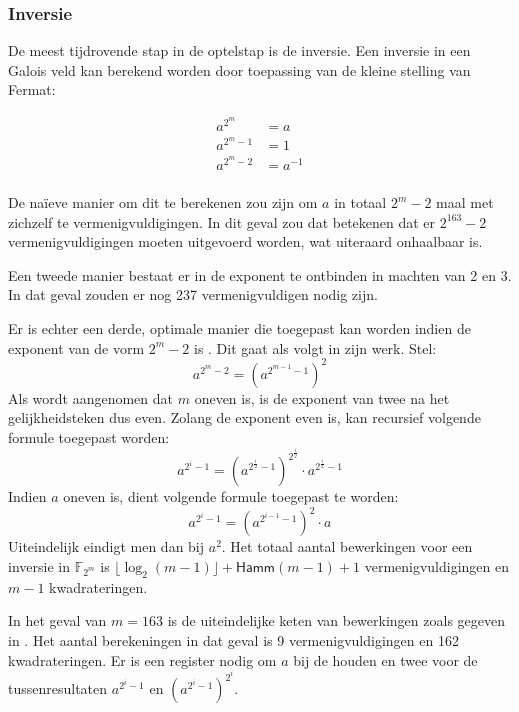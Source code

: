 \subsubsection{Inversie}

De meest tijdrovende stap in de optelstap is de inversie.  Een inversie in een Galois veld kan berekend worden door toepassing van de kleine stelling van Fermat:

\[\begin{aligned}
a^{2^m}		&= a\\
a^{2^m - 1}	&= 1\\
a^{2^m - 2}	&= a^{-1}\\
\end{aligned}\]


De na\"ieve manier om dit te berekenen zou zijn om $a$ in totaal $2^m - 2$ maal met zichzelf te vermenigvuldigingen. In dit geval zou dat betekenen dat er $2^{163} - 2$ vermenigvuldigingen moeten uitgevoerd worden, wat uiteraard onhaalbaar is.

Een tweede manier bestaat er in de exponent te ontbinden in machten van 2 en 3. In dat geval zouden er nog 237 vermenigvuldigen nodig zijn.

Er is echter een derde, optimale manier die toegepast kan worden indien de exponent van de vorm $2^m - 2$ is \cite{batina-pkc, itoh}. Dit gaat als volgt in zijn werk. Stel:
\[a^{2^m - 2} = (a^{2^{m - 1} - 1})^2\]
Als wordt aangenomen dat $m$ oneven is, is de exponent van twee na het gelijkheidsteken dus even. Zolang de exponent even is, kan recursief volgende formule toegepast worden:
\[a^{2^i - 1} = (a^{2^{\frac{i}{2}} - 1})^{2^{\frac{i}{2}}} \cdot a^{2^{\frac{i}{2}} - 1}\]
Indien $a$ oneven is, dient volgende formule toegepast te worden:
\[a^{2^i - 1} = (a^{2^{i - 1} - 1})^2 \cdot a\]
Uiteindelijk eindigt men dan bij $a^2$. Het totaal aantal bewerkingen voor een inversie in $\mathbb{F}_{2^m}$ is $\lfloor\log_2(m - 1)\rfloor + \textsf{Hamm}(m - 1) + 1$ vermenigvuldigingen en $m - 1$ kwadrateringen.

In het geval van $m = 163$ is de uiteindelijke keten van bewerkingen zoals gegeven in . Het aantal berekeningen in dat geval is 9 vermenigvuldigingen en 162 kwadrateringen. Er is een register nodig om $a$ bij de houden en twee voor de tussenresultaten $a^{2^i - 1}$ en $(a^{2^i - 1})^{2^i}$.

